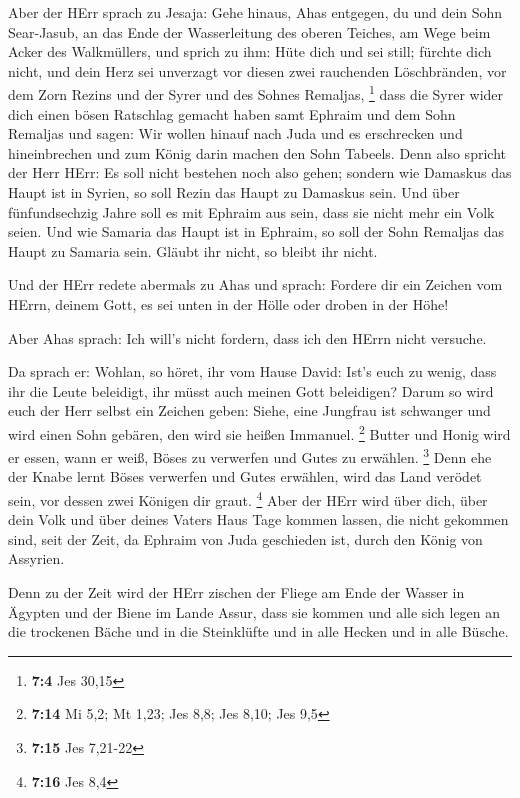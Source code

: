  Aber der HErr sprach zu Jesaja: Gehe hinaus, Ahas entgegen,
du und dein Sohn Sear-Jasub, an das Ende der Wasserleitung des oberen
Teiches, am Wege beim Acker des Walkmüllers,  und sprich zu
ihm: Hüte dich und sei still; fürchte dich nicht, und dein Herz sei
unverzagt vor diesen zwei rauchenden Löschbränden, vor dem Zorn Rezins
und der Syrer und des Sohnes Remaljas, \footnote{\textbf{7:4} Jes 30,15}
 dass die Syrer wider dich einen bösen Ratschlag gemacht
haben samt Ephraim und dem Sohn Remaljas und sagen:  Wir
wollen hinauf nach Juda und es erschrecken und hineinbrechen und zum
König darin machen den Sohn Tabeels.  Denn also spricht der
Herr HErr: Es soll nicht bestehen noch also gehen;  sondern
wie Damaskus das Haupt ist in Syrien, so soll Rezin das Haupt zu
Damaskus sein. Und über fünfundsechzig Jahre soll es mit Ephraim aus
sein, dass sie nicht mehr ein Volk seien.  Und wie Samaria
das Haupt ist in Ephraim, so soll der Sohn Remaljas das Haupt zu Samaria
sein. Gläubt ihr nicht, so bleibt ihr nicht.

 Und der HErr redete abermals zu Ahas und sprach:
 Fordere dir ein Zeichen vom HErrn, deinem Gott, es sei
unten in der Hölle oder droben in der Höhe!

 Aber Ahas sprach: Ich will's nicht fordern, dass ich den
HErrn nicht versuche.

 Da sprach er: Wohlan, so höret, ihr vom Hause David: Ist's
euch zu wenig, dass ihr die Leute beleidigt, ihr müsst auch meinen Gott
beleidigen?  Darum so wird euch der Herr selbst ein Zeichen
geben: Siehe, eine Jungfrau ist schwanger und wird einen Sohn gebären,
den wird sie heißen Immanuel. \footnote{\textbf{7:14} Mi 5,2; Mt 1,23;
  Jes 8,8; Jes 8,10; Jes 9,5}  Butter und Honig wird er
essen, wann er weiß, Böses zu verwerfen und Gutes zu erwählen.
\footnote{\textbf{7:15} Jes 7,21-22}  Denn ehe der Knabe
lernt Böses verwerfen und Gutes erwählen, wird das Land verödet sein,
vor dessen zwei Königen dir graut. \footnote{\textbf{7:16} Jes 8,4}
 Aber der HErr wird über dich, über dein Volk und über
deines Vaters Haus Tage kommen lassen, die nicht gekommen sind, seit der
Zeit, da Ephraim von Juda geschieden ist, durch den König von Assyrien.

 Denn zu der Zeit wird der HErr zischen der Fliege am Ende
der Wasser in Ägypten und der Biene im Lande Assur,  dass
sie kommen und alle sich legen an die trockenen Bäche und in die
Steinklüfte und in alle Hecken und in alle Büsche.

